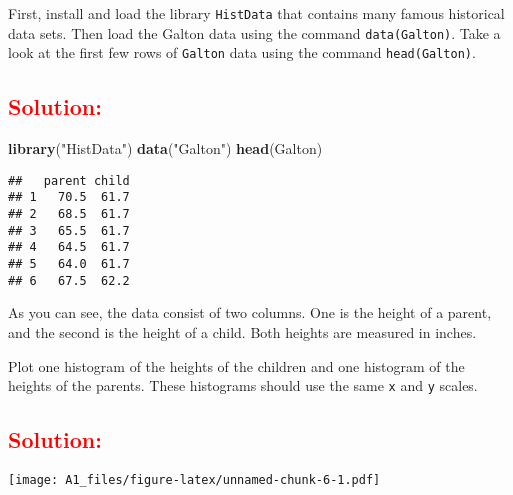 \documentclass[]{article}
\newenvironment{Shaded}{\begin{snugshade}}{\end{snugshade}}
\newcommand{\KeywordTok}[1]{\textcolor[rgb]{0.13,0.29,0.53}{\textbf{#1}}}
\newcommand{\DataTypeTok}[1]{\textcolor[rgb]{0.13,0.29,0.53}{#1}}
\newcommand{\StringTok}[1]{\textcolor[rgb]{0.31,0.60,0.02}{#1}}
\newcommand{\OtherTok}[1]{\textcolor[rgb]{0.56,0.35,0.01}{#1}}
\newcommand{\OperatorTok}[1]{\textcolor[rgb]{0.81,0.36,0.00}{\textbf{#1}}}
\newcommand{\NormalTok}[1]{#1}
\begin{document}
First, install and load the library \texttt{HistData} that contains many
famous historical data sets. Then load the Galton data using the command
\texttt{data(Galton)}. Take a look at the first few rows of
\texttt{Galton} data using the command \texttt{head(Galton)}.

\subsection{\texorpdfstring{\textcolor{red}{Solution:}}{}}\label{section-4}

\begin{Shaded}
\begin{Highlighting}[]
\KeywordTok{library}\NormalTok{(}\StringTok{"HistData"}\NormalTok{)}
\KeywordTok{data}\NormalTok{(}\StringTok{"Galton"}\NormalTok{)}
\KeywordTok{head}\NormalTok{(Galton)}
\end{Highlighting}
\end{Shaded}

\begin{verbatim}
##   parent child
## 1   70.5  61.7
## 2   68.5  61.7
## 3   65.5  61.7
## 4   64.5  61.7
## 5   64.0  61.7
## 6   67.5  62.2
\end{verbatim}

As you can see, the data consist of two columns. One is the height of a
parent, and the second is the height of a child. Both heights are
measured in inches.

Plot one histogram of the heights of the children and one histogram of
the heights of the parents. These histograms should use the same
\texttt{x} and \texttt{y} scales.

\subsection{\texorpdfstring{\textcolor{red}{Solution:}}{}}\label{section-5}

\begin{Shaded}
\end{Shaded}

\texttt{[image: A1\_files/figure-latex/unnamed-chunk-6-1.pdf]}

\begin{Shaded}
\end{Shaded}
\end{document}
